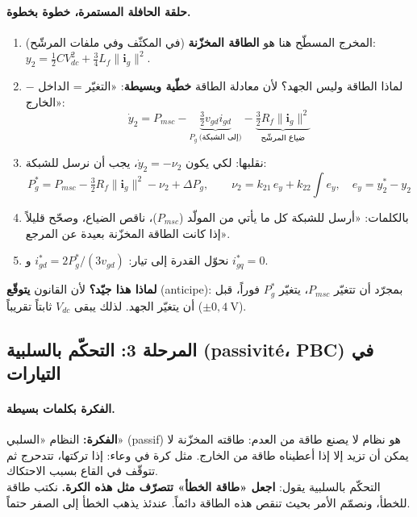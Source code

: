 \documentclass[11pt,a4paper]{article}
\newcommand{\fr}[1]{\textfrench{#1}}
\newcommand{\bv}[1]{\boldsymbol{#1}}
\newcommand{\Fikra}{\textbf{الفكرة: }}
\begin{document}
\paragraph{حلقة الحافلة المستمرة، خطوة بخطوة.}
\begin{enumerate}
\item المخرج المسطّح هنا هو \textbf{الطاقة المخزّنة} (في المكثّف وفي ملفات المرشّح):
$y_2 = \tfrac12 C V_{dc}^2 + \tfrac34 L_f\|\bv{i}_g\|^2$.
\item لماذا الطاقة وليس الجهد؟ لأن معادلة الطاقة \textbf{خطّية وبسيطة}: «التغيّر = الداخل $-$ الخارج»:
\[
\dot y_2 = P_{msc} - \underbrace{\tfrac32 v_{gd} i_{gd}}_{P_g\ \text{(إلى الشبكة)}} - \underbrace{\tfrac32 R_f\|\bv{i}_g\|^2}_{\text{ضياع المرشّح}}
\]
\item نقلبها: لكي يكون $\dot y_2 = -\nu_2$، يجب أن نرسل للشبكة:
\begin{equation}
\boxed{P_g^* = P_{msc} - \tfrac32 R_f\|\bv{i}_g\|^2 - \nu_2 + \Delta P_g},\qquad
\nu_2 = k_{21}\,e_y + k_{22}\!\int\! e_y,\quad e_y = y_2^*-y_2
\end{equation}
\item بالكلمات: «أرسل للشبكة كل ما يأتي من المولّد ($P_{msc}$)، ناقص الضياع، وصحّح قليلاً إذا كانت
الطاقة المخزّنة بعيدة عن المرجع».
\item نحوّل القدرة إلى تيار: $i_{gd}^* = 2P_g^*/(3 v_{gd})$ و $i_{gq}^* = 0$.
\end{enumerate}
\textbf{لماذا هذا جيّد؟} لأن القانون \textbf{يتوقّع} (\fr{anticipe}): بمجرّد أن تتغيّر $P_{msc}$، يتغيّر
$P_g^*$ فوراً، قبل أن يتغيّر الجهد. لذلك يبقى $V_{dc}$ ثابتاً تقريباً ($\pm 0{,}4\ \mathrm{V}$).

\subsection{المرحلة 3: التحكّم بالسلبية (\fr{passivité}، \fr{PBC}) في التيارات}

\paragraph{الفكرة بكلمات بسيطة.}
\begin{fikra}
\Fikra
النظام «السلبي» (\fr{passif}) هو نظام لا يصنع طاقة من العدم: طاقته المخزّنة لا يمكن أن تزيد إلا إذا
أعطيناه طاقة من الخارج. مثل كرة في وعاء: إذا تركتها، تتدحرج ثم تتوقّف في القاع بسبب الاحتكاك.\\
التحكّم بالسلبية يقول: \textbf{اجعل «طاقة الخطأ» تتصرّف مثل هذه الكرة.} نكتب طاقة للخطأ، ونصمّم
الأمر بحيث تنقص هذه الطاقة دائماً. عندئذ يذهب الخطأ إلى الصفر حتماً.
\end{fikra}
\end{document}
